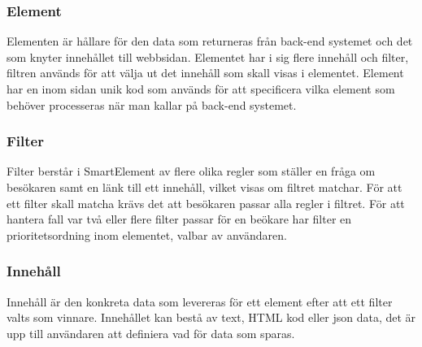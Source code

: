 \subsubsection{Element}

Elementen är hållare för den data som returneras från back-end systemet och det som knyter innehållet till webbsidan. Elementet har i sig flere innehåll och filter, filtren används för att välja ut det innehåll som skall visas i elementet. Element har en inom sidan unik kod som används för att specificera vilka element som behöver processeras när man kallar på back-end systemet.

\subsubsection{Filter}

Filter berstår i SmartElement av flere olika regler som ställer en fråga om besökaren samt en länk till ett innehåll, vilket visas om filtret matchar. För att ett filter skall matcha krävs det att besökaren passar alla regler i filtret. För att hantera fall var två eller flere filter passar för en beökare har filter en prioritetsordning inom elementet, valbar av användaren.

\subsubsection{Innehåll}

Innehåll är den konkreta data som levereras för ett element efter att ett filter valts som vinnare. Innehållet kan bestå av text, HTML kod eller \gls{json} data, det är upp till användaren att definiera vad för data som sparas.